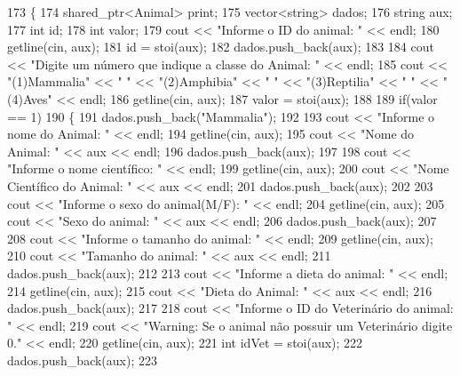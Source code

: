 \begin{DoxyCode}
173 \{
174     shared\_ptr<Animal> print;
175     vector<string> dados;
176     \textcolor{keywordtype}{string} aux;
177     \textcolor{keywordtype}{int} id;
178     \textcolor{keywordtype}{int} valor;
179     cout << \textcolor{stringliteral}{"Informe o ID do animal: "} << endl;
180     getline(cin, aux);
181     \textcolor{keywordtype}{id} = stoi(aux);
182     dados.push\_back(aux);
183 
184     cout << \textcolor{stringliteral}{"Digite um número que indique a classe do Animal: "} << endl;
185     cout << \textcolor{stringliteral}{"(1)Mammalia"} << \textcolor{stringliteral}{" "} << \textcolor{stringliteral}{"(2)Amphibia"} << \textcolor{stringliteral}{" "} << \textcolor{stringliteral}{"(3)Reptilia"} << \textcolor{stringliteral}{" "} << \textcolor{stringliteral}{"(4)Aves"} << endl;
186     getline(cin, aux);
187     valor = stoi(aux);
188 
189     \textcolor{keywordflow}{if}(valor == 1)
190     \{
191         dados.push\_back(\textcolor{stringliteral}{"Mammalia"});
192 
193         cout << \textcolor{stringliteral}{"Informe o nome do Animal: "} << endl;
194         getline(cin, aux);
195         cout << \textcolor{stringliteral}{"Nome do Animal: "} << aux << endl;
196         dados.push\_back(aux);
197 
198         cout << \textcolor{stringliteral}{"Informe o nome científico:  "} << endl;
199         getline(cin, aux);
200         cout << \textcolor{stringliteral}{"Nome Científico do Animal: "} << aux << endl;
201         dados.push\_back(aux);
202 
203         cout << \textcolor{stringliteral}{"Informe o sexo do animal(M/F): "} << endl;
204         getline(cin, aux);
205         cout << \textcolor{stringliteral}{"Sexo do animal: "} << aux << endl;
206         dados.push\_back(aux);
207 
208         cout << \textcolor{stringliteral}{"Informe o tamanho do animal: "} << endl;
209         getline(cin, aux);
210         cout << \textcolor{stringliteral}{"Tamanho do animal: "} << aux << endl;
211         dados.push\_back(aux);
212 
213         cout << \textcolor{stringliteral}{"Informe a dieta do animal: "} << endl;
214         getline(cin, aux);
215         cout << \textcolor{stringliteral}{"Dieta do Animal: "} << aux << endl;
216         dados.push\_back(aux);
217 
218         cout << \textcolor{stringliteral}{"Informe o ID do Veterinário do animal: "} << endl;
219         cout << \textcolor{stringliteral}{"Warning: Se o animal não possuir um Veterinário digite 0."} << endl;
220         getline(cin, aux);
221         \textcolor{keywordtype}{int} idVet = stoi(aux);
222         dados.push\_back(aux);
223 

\end{DoxyCode}
